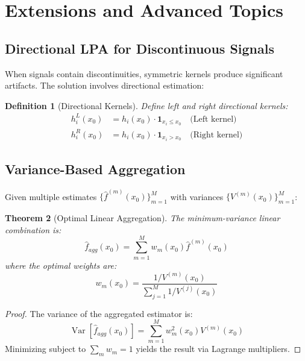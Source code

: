 \documentclass[12pt]{article}
\DeclareMathOperator{\Var}{Var}
\newtheorem{theorem}{Theorem}[section]
\newtheorem{definition}[theorem]{Definition}
\begin{document}
\newpage

\section{Extensions and Advanced Topics}

\subsection{Directional LPA for Discontinuous Signals}

When signals contain discontinuities, symmetric kernels produce significant artifacts. The solution involves directional estimation:

\begin{definition}[Directional Kernels]
    Define left and right directional kernels:
    \begin{align}
        h^L_i(x_0) & = h_i(x_0) \cdot \mathbf{1}_{x_i \leq x_0} \quad \text{(Left kernel)} \\
        h^R_i(x_0) & = h_i(x_0) \cdot \mathbf{1}_{x_i > x_0} \quad \text{(Right kernel)}
    \end{align}
\end{definition}

\subsection{Variance-Based Aggregation}

Given multiple estimates $\{\hat{f}^{(m)}(x_0)\}_{m=1}^M$ with variances $\{V^{(m)}(x_0)\}_{m=1}^M$:

\begin{theorem}[Optimal Linear Aggregation]
    The minimum-variance linear combination is:
    \begin{equation}
        \hat{f}_{agg}(x_0) = \sum_{m=1}^{M} w_m(x_0) \hat{f}^{(m)}(x_0)
        \label{eq:aggregation}
    \end{equation}
    where the optimal weights are:
    \begin{equation}
        w_m(x_0) = \frac{1/V^{(m)}(x_0)}{\sum_{j=1}^{M} 1/V^{(j)}(x_0)}
        \label{eq:optimal_weights}
    \end{equation}
\end{theorem}

\begin{proof}
    The variance of the aggregated estimator is:
    \begin{equation}
        \Var[\hat{f}_{agg}(x_0)] = \sum_{m=1}^{M} w_m^2(x_0) V^{(m)}(x_0)
    \end{equation}
    Minimizing subject to $\sum_m w_m = 1$ yields the result via Lagrange multipliers.
\end{proof}
\end{document}
